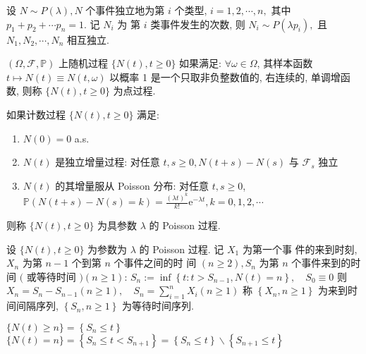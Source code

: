 \documentclass[10pt]{yerbaformat}
\begin{document}
\begin{theorem}
    设 $N \sim P(\lambda), N$ 个事件独立地为第 $i$ 个类型, $i=1,2, \cdots, n,$ 其中 $p_{1}+p_{2}+\cdots p_{n}=1 .$ 记 $N_{i}$ 为 第 $i$ 类事件发生的次数, 则 $N_{i} \sim P\left(\lambda p_{i}\right),$ 且 $N_{1}, N_{2}, \cdots, N_{n}$ 相互独立.
\end{theorem}

\begin{definition}[点过程]
    $(\Omega, \mathcal{F}, \mathbb{P})$ 上随机过程 $\{N(t), t \geq 0\}$ 如果满足:
    $\forall \omega \in \Omega$, 其样本函数 $t \mapsto N(t) \equiv N(t, \omega)$
    以概率 1 是一个只取非负整数值的, 右连续的, 单调增函数, 则称 $\{N(t), t \geq 0\}$ 为点过程.
\end{definition}

\begin{definition}
    如果计数过程 $\{N(t), t \geq 0\}$ 满足:
    \begin{enumerate}
        \item $N(0)=0$ a.s.
        \item $N(t)$ 是独立增量过程: 对任意 $t, s \geq 0, N(t+s)-N(s)$ 与 $\mathcal{F}_{s}$ 独立
        \item $N(t)$ 的其增量服从 Poisson 分布: 对任意 $t, s \geq 0$, $\mathbb{P}(N(t+s)-N(s)=k)=\frac{(\lambda t)^{k}}{k !} \mathrm{e}^{-\lambda t}, k=0,1,2, \cdots$
    \end{enumerate}
    则称 $\{N(t), t \geq 0\}$ 为具参数 $\lambda$ 的 Poisson 过程.
\end{definition}

\begin{definition}
    设 $\{N(t), t \geq 0\}$ 为参数为 $\lambda$ 的 Poisson 过程. 记 $X_{1}$ 为第一个事 件的来到时刻, $X_{n}$ 为第 $n-1$ 个到第 $n$ 个事件之间的时 间 $(n \geq 2), S_{n}$ 为第 $n$ 个事件来到的时间 $($ 或等待时间 $)(n \geq 1)$: $S_{n}:=\inf \left\{t: t>S_{n-1}, N(t)=n\right\}, \quad S_{0} \equiv 0$ 则 $X_{n}=S_{n}-S_{n-1}(n \geq 1), \quad S_{n}=\sum_{i=1}^{n} X_{i}(n \geq 1)$ 称 $\left\{X_{n}, n \geq 1\right\}$ 为来到时间间隔序列, $\left\{S_{n}, n \geq 1\right\}$ 为等待时间序列.
\end{definition}

\begin{lemma}
    $\{N(t) \geq n\}=\left\{S_{n} \leq t\right\}$ \\
    $\{N(t)=n\}=\left\{S_{n} \leq t<S_{n+1}\right\}=\left\{S_{n} \leq t\right\} \backslash\left\{S_{n+1} \leq t\right\}$
\end{lemma}
\end{document}
